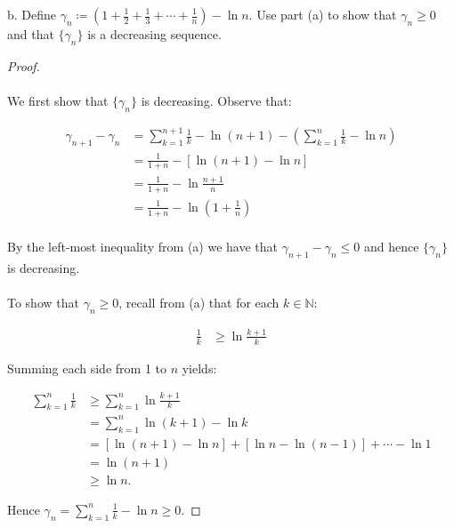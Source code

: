 b.  Define $\gamma_n \coloneqq \left(1 + \frac{1}{2} + \frac{1}{3} + \cdots + \frac{1}{n} \right) - \ln{n}.$
    Use part (a) to show that $\gamma_n \ge 0$ and that $\{\gamma_n\}$ is a
    decreasing sequence.

    \begin{proof}\ \\\\

        We first show that $\{\gamma_n\}$ is decreasing. Observe that:

        \begin{align*}
            \gamma_{n+1} - \gamma_n &= \sum\limits_{k=1}^{n+1}{\frac{1}{k}} - \ln{(n+1)} - \left(\sum\limits_{k=1}^{n}{\frac{1}{k}} - \ln{n}\right) \\
                                    &= \frac{1}{1+n} - \left[\ln{(n+1)} - \ln{n}\right] \\
                                    &= \frac{1}{1+n} - \ln{\frac{n+1}{n}} \\
                                    &= \frac{1}{1+n} - \ln{\left(1 + \frac{1}{n}\right)} \\
        \end{align*}

        By the left-most inequality from (a) we have that
        $\gamma_{n+1} - \gamma_n \le 0$ and hence $\{\gamma_n\}$ is decreasing.
        \\\\

        To show that $\gamma_n \ge 0$, recall from (a) that for each
        $k \in \mathbb{N}$:

        \begin{align*}
            \frac{1}{k} &\ge \ln{\frac{k + 1}{k}} 
        \end{align*}

        Summing each side from 1 to $n$ yields:

        \begin{align*}
             \sum\limits_{k=1}^{n}{\frac{1}{k}} &\ge \sum\limits_{k=1}^{n}{\ln{\frac{k + 1}{k}}} \\
                                                &= \sum\limits_{k=1}^{n}{\ln{(k + 1) - \ln{k}}}  \\
                                                &= \left[\ln{(n+1)}  - \ln{n}\right] + \left[\ln{n} - \ln{(n-1)}\right] + \cdots - \ln{1} \\
                                                &= \ln{(n+1)} \\
                                                &\ge \ln{n}.
        \end{align*}

        Hence $\gamma_n = \sum\limits_{k=1}^{n}{\frac{1}{k}} - \ln{n} \ge 0$.

    \end{proof}

